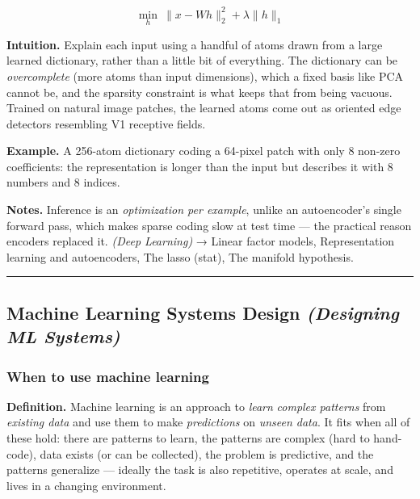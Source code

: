 \documentclass[
  10pt,
  letterpaper,
  onecolumn]{article}
\begin{document}
\begin{equation*}
\min_{h}\ \|x-Wh\|_2^{2}+\lambda\|h\|_1
\end{equation*}

\textbf{Intuition.} Explain each input using a handful of atoms drawn
from a large learned dictionary, rather than a little bit of everything.
The dictionary can be \emph{overcomplete} (more atoms than input
dimensions), which a fixed basis like PCA cannot be, and the sparsity
constraint is what keeps that from being vacuous. Trained on natural
image patches, the learned atoms come out as oriented edge detectors
resembling V1 receptive fields.

\textbf{Example.} A 256-atom dictionary coding a 64-pixel patch with
only 8 non-zero coefficients: the representation is longer than the
input but describes it with 8 numbers and 8 indices.

\textbf{Notes.} Inference is an \emph{optimization per example}, unlike
an autoencoder's single forward pass, which makes sparse coding slow at
test time --- the practical reason encoders replaced it. \emph{(Deep
Learning)} → Linear factor models, Representation learning and
autoencoders, The lasso (stat), The manifold hypothesis.

\begin{center}\rule{0.5\linewidth}{0.5pt}\end{center}

\hypertarget{machine-learning-systems-design-designing-ml-systems}{%
\subsection{\texorpdfstring{Machine Learning Systems Design
\emph{(Designing ML
Systems)}}{Machine Learning Systems Design (Designing ML Systems)}}\label{machine-learning-systems-design-designing-ml-systems}}

\hypertarget{when-to-use-machine-learning}{%
\subsubsection{When to use machine
learning}\label{when-to-use-machine-learning}}

\textbf{Definition.} Machine learning is an approach to \emph{learn}
\emph{complex patterns} from \emph{existing data} and use them to make
\emph{predictions} on \emph{unseen data}. It fits when all of these
hold: there are patterns to learn, the patterns are complex (hard to
hand-code), data exists (or can be collected), the problem is
predictive, and the patterns generalize --- ideally the task is also
repetitive, operates at scale, and lives in a changing environment.
\end{document}
